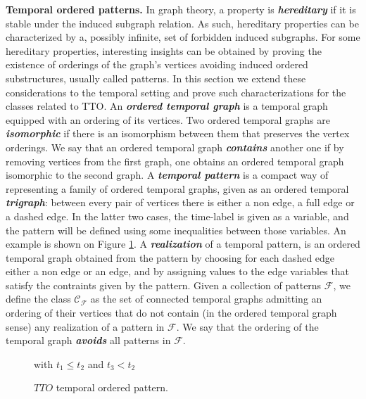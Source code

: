 \documentclass[runningheads]{llncs}
\newcommand{\bfit}[1]{\textbf{\textit{#1}}}
\begin{document}
\vspace{1ex}
\textbf{Temporal ordered patterns.} In graph theory, a property is  \bfit{hereditary} if it is stable under the induced subgraph relation. As such, hereditary properties can be characterized by a, possibly infinite, set of forbidden induced subgraphs. For some hereditary properties, interesting insights can be obtained by proving the existence of orderings of the graph's vertices avoiding induced ordered substructures, usually called patterns. In this section we extend these considerations to the temporal setting and prove such characterizations for the classes related to TTO. An \bfit{ordered temporal graph} is a temporal graph equipped with an ordering of its vertices. Two ordered temporal graphs are \bfit{isomorphic} if there is an isomorphism between them that preserves the vertex orderings. We say that an ordered temporal graph \bfit{contains} another one if by removing vertices from the first graph, one obtains an ordered temporal graph isomorphic to the second graph. A \bfit{temporal pattern} is a compact way of representing a family of ordered temporal graphs, given as an ordered temporal \bfit{trigraph}: between every pair of vertices there is either a non edge, a full edge or a dashed edge. In the latter two cases, the time-label is given as a variable, and the pattern will be defined using some inequalities between those variables. An example is shown on Figure \ref{fig:orderedpatterns-tto}. A \bfit{realization} of a temporal pattern, is an ordered temporal graph obtained from the pattern by choosing for each dashed edge either a non edge or an edge, and by assigning values to the edge variables that satisfy the contraints given by the pattern. Given a collection of patterns $\mathcal{F}$, we define the class $\mathcal{C_{\mathcal{F}}}$ as the set of connected temporal graphs admitting an ordering of their vertices that do not contain (in the ordered temporal graph sense) any realization of a pattern in $\mathcal F$. We say that the ordering of the temporal graph  \bfit{avoids} all patterns in $\mathcal F$. 

\begin{figure}[H]
\begin{center}

\vspace{1ex}
with $t_{1} \leq t_{2}$ and $t_3< t_{2}$
\end{center}
\caption{$TTO$ temporal ordered pattern.}
\label{fig:orderedpatterns-tto}
\end{figure}
\end{document}
